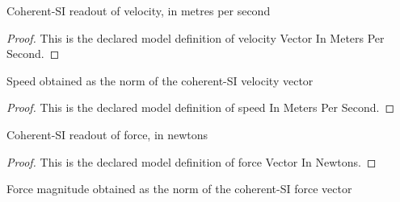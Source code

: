\begin{definition}
  \label{def:physics:phyx-mini-0912:phyxminiproblems-problemphyxmini0912-velocityvectorinmeterspersecond}
  Coherent-SI readout of velocity, in metres per second
\end{definition}
\begin{proof}
  This is the declared model definition of velocity Vector In Meters Per Second.
\end{proof}
\begin{definition}
  \label{def:physics:phyx-mini-0912:phyxminiproblems-problemphyxmini0912-speedinmeterspersecond}
  Speed obtained as the norm of the coherent-SI velocity vector
\end{definition}
\begin{proof}
  This is the declared model definition of speed In Meters Per Second.
\end{proof}
\begin{definition}
  \label{def:physics:phyx-mini-0912:phyxminiproblems-problemphyxmini0912-forcevectorinnewtons}
  Coherent-SI readout of force, in newtons
\end{definition}
\begin{proof}
  This is the declared model definition of force Vector In Newtons.
\end{proof}
\begin{definition}
  \label{def:physics:phyx-mini-0912:phyxminiproblems-problemphyxmini0912-forcemagnitudeinnewtons}
  Force magnitude obtained as the norm of the coherent-SI force vector
\end{definition}
